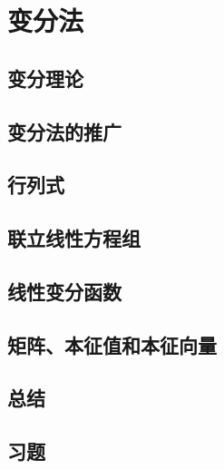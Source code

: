 \chapter{变分法}
\section{变分理论}

\section{变分法的推广}

\section{行列式}

\section{联立线性方程组}

\section{线性变分函数}

\section{矩阵、本征值和本征向量}

\section*{总结}

\section*{习题}